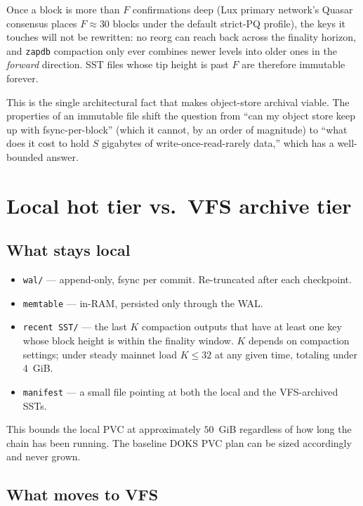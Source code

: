 \documentclass[11pt,a4paper]{article}
\begin{document}
Once a block is more than $F$ confirmations deep (Lux primary
network's Quasar consensus places $F \approx 30$ blocks under the
default strict-PQ profile), the keys it touches will not be rewritten:
no reorg can reach back across the finality horizon, and \texttt{zapdb}
compaction only ever combines newer levels into older ones in the
\emph{forward} direction. SST files whose tip height is past $F$ are
therefore immutable forever.

This is the single architectural fact that makes object-store
archival viable. The properties of an immutable file shift the
question from ``can my object store keep up with fsync-per-block''
(which it cannot, by an order of magnitude) to ``what does it cost to
hold $S$ gigabytes of write-once-read-rarely data,'' which has a
well-bounded answer.

\section{Local hot tier vs.\ VFS archive tier}

\subsection{What stays local}

\begin{itemize}[noitemsep]
  \item \texttt{wal/} --- append-only, fsync per commit. Re-truncated
    after each checkpoint.
  \item \texttt{memtable} --- in-RAM, persisted only through the WAL.
  \item \texttt{recent SST/} --- the last $K$ compaction outputs that
    have at least one key whose block height is within the finality
    window. $K$ depends on compaction settings; under steady mainnet
    load $K \le 32$ at any given time, totaling under 4~GiB.
  \item \texttt{manifest} --- a small file pointing at both the local
    and the VFS-archived SSTs.
\end{itemize}

This bounds the local PVC at approximately $50$~GiB regardless of how
long the chain has been running. The baseline DOKS PVC plan can be
sized accordingly and never grown.

\subsection{What moves to VFS}
\end{document}
